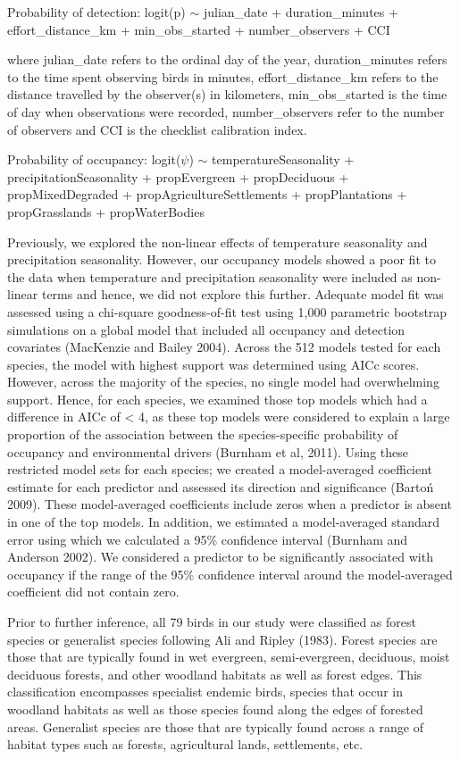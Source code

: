 Probability of detection:
logit(p) $\sim$ julian\_date + duration\_minutes + effort\_distance\_km + min\_obs\_started + number\_observers + CCI

where julian\_date refers to the ordinal day of the year, duration\_minutes refers to the time spent observing birds in minutes, effort\_distance\_km refers to the distance travelled by the observer(s) in kilometers, min\_obs\_started is the time of day when observations were recorded, number\_observers refer to the number of observers and CCI is the checklist calibration index.


Probability of occupancy:
logit($\psi$) $\sim$ temperatureSeasonality + precipitationSeasonality + propEvergreen + propDeciduous + propMixedDegraded + propAgricultureSettlements + propPlantations + propGrasslands + propWaterBodies

Previously, we explored the non-linear effects of temperature seasonality and precipitation seasonality.
However, our occupancy models showed a poor fit to the data when temperature and precipitation seasonality were included as non-linear terms and hence, we did not explore this further.
Adequate model fit was assessed using a chi-square goodness-of-fit test using 1,000 parametric bootstrap simulations on a global model that included all occupancy and detection covariates (MacKenzie and Bailey 2004).
Across the 512 models tested for each species, the model with highest support was determined using AICc scores.
However, across the majority of the species, no single model had overwhelming support.
Hence, for each species, we examined those top models which had a difference in AICc of < 4, as these top models were considered to explain a large proportion of the association between the species-specific probability of occupancy and environmental drivers (Burnham et al, 2011).
Using these restricted model sets for each species; we created a model-averaged coefficient estimate for each predictor and assessed its direction and significance (Bartoń 2009).
These model-averaged coefficients include zeros when a predictor is absent in one of the top models.
In addition, we estimated a model-averaged standard error using which we calculated a 95\% confidence interval (Burnham and Anderson 2002).
We considered a predictor to be significantly associated with occupancy if the range of the 95\% confidence interval around the model-averaged coefficient did not contain zero.

Prior to further inference, all 79 birds in our study were classified as forest species or generalist species following Ali and Ripley (1983).
Forest species are those that are typically found in wet evergreen, semi-evergreen, deciduous, moist deciduous forests, and other woodland habitats as well as forest edges.
This classification encompasses specialist endemic birds, species that occur in woodland habitats as well as those species found along the edges of forested areas.
Generalist species are those that are typically found across a range of habitat types such as forests, agricultural lands, settlements, etc.

